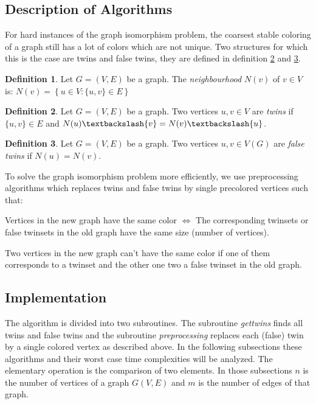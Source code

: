 \documentclass[twoside]{article}
\theoremstyle{definition}
\newtheorem{definition}{Definition}
\theoremstyle{plain}
\begin{document}
\begin{multicols}{2}
\section{Description of Algorithms}
For hard instances of the graph isomorphism problem, the coarsest stable coloring of a graph still has a lot of colors which are not unique. Two structures for which this is the case are twins and false twins, they are defined in definition \ref{deftwins} and \ref{deffalsetwins}.
\begin{definition}
Let $G = (V,E)$ be a graph. The \emph{neighbourhood} $N(v)$ of $v \in V$ is:
$N(v) = \left\{{u \in V : \{u,v\} \in E}\right\}$
\end{definition}
\begin{definition}\label{deftwins}
Let $G = (V,E)$ be a graph.
Two vertices $u, v \in V$ are \emph{twins} if $\{u,v\} \in E$ and $N(u)\textbackslash \{v\} = N(v)\textbackslash \{u\}$.
\end{definition}
\begin{definition}\label{deffalsetwins}
Let $G = (V,E)$ be a graph.
Two vertices $u, v \in V(G)$ are \emph{false twins} if $N(u) = N(v).$
\end{definition}

To solve the graph isomorphism problem more efficiently, we use preprocessing algorithms which replaces twins and false twins by single precolored vertices such that:
\begin{compactenum}
\item Vertices in the new graph have the same color $\iff$ The corresponding twinsets or false twinsets in the old graph have the same size (number of vertices).
\item Two vertices in the new graph can't have the same color if one of them corresponds to a twinset and the other one two a false twinset in the old graph.
\end{compactenum}

\subsection{Implementation}
The algorithm is divided into two subroutines. The subroutine \emph{gettwins} finds all twins and false twins and the subroutine \emph{preprocessing} replaces each (false) twin by a single colored vertex as described above. In the following subsections these algorithms and their worst case time complexities will be analyzed. The elementary operation is the comparison of two elements. In those subsections $n$ is the number of vertices of a graph $G(V,E)$ and $m$ is the number of edges of that graph.


\end{multicols}
\end{document}
